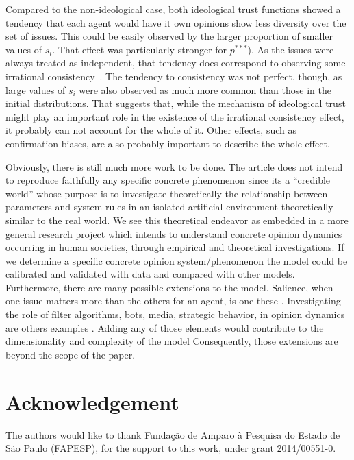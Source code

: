 \documentclass{article}
\begin{document}
    Compared to the non-ideological case, both ideological trust functions
    showed a tendency that each agent would have it own opinions show less
    diversity over the set of issues. This could be easily observed by the
    larger proportion of smaller values of $s_i$. That effect was particularly
    stronger for \( p^{***}\)). As the issues were always treated as
    independent, that tendency does correspond to observing some irrational
    consistency~\cite{jervis76a}. The tendency to consistency was not perfect,
    though, as large values of $s_i$ were also observed as much more common than
    those in the initial distributions. That suggests that, while the mechanism
    of ideological trust might play an important role in the existence of the
    irrational consistency effect, it probably can not account for the whole of
    it. Other effects, such as confirmation biases, are also probably important
    to describe the whole effect.

    Obviously, there is still much more work to be done. The article does not
    intend to reproduce faithfully any specific concrete phenomenon since its a
    ``credible world'' \cite{sugden2000credible, sugden2009credible} whose
    purpose is to investigate theoretically the relationship between parameters
    and system rules in an isolated artificial environment theoretically similar
    to the real world. We see this theoretical endeavor as embedded in a more
    general research project which intends to understand concrete opinion
    dynamics occurring in human societies, through empirical and theoretical
    investigations. If we determine a specific concrete opinion
    system/phenomenon the model could be calibrated and validated with data and
    compared with other models. Furthermore, there are many possible extensions
    to the model. Salience, when one issue matters more than the others for an
    agent, is one these \cite{hinich1997analytical,basu2019bridging}.
    Investigating the role of filter algorithms, bots, media, strategic
    behavior, in opinion dynamics are others examples \cite{roth2019algorithmic,
      ding2010evolutionary}. Adding any of those elements would contribute to
    the dimensionality and complexity of the model \cite{de2005computational}
    Consequently, those extensions are beyond the scope of the paper.


\section{Acknowledgement}
The authors would like to thank Funda\c{c}\~ao de Amparo \`a Pesquisa do Estado
de S\~ao Paulo (FAPESP), for the support to this work, under grant 2014/00551-0.


%
\printbibliography
\end{document}
